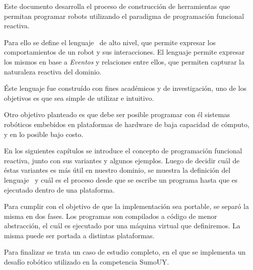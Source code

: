 
  Este documento desarrolla el proceso de construcción de
herramientas
que permitan programar robots utilizando el paradigma de
programación funcional reactiva.

  Para ello se define el lenguaje \frob\ de alto nivel,
que permite expresar los comportamientos de un robot y sus
interacciones.
  El lenguaje permite expresar los mismos en base a
\emph{Eventos} y relaciones entre ellos, que permiten
capturar la naturaleza reactiva del dominio.

  Éste lenguaje fue construído con fines académicos y de
investigación, uno de los objetivos es que sea simple de
utilizar e intuitivo.

  Otro objetivo planteado es que debe ser posible programar
con él sistemas robóticos embebidos en plataformas de
hardware de baja capacidad de cómputo, y en lo posible
bajo costo.

  En los siguientes capítulos se introduce el concepto de
programación funcional reactiva, junto con sus variantes y
algunos ejemplos.
  Luego de decidir cuál de éstas variantes es más útil
en nuestro dominio, se muestra la definición del lenguaje
\frob\ y cuál es el proceso desde que se escribe un programa
hasta que es ejecutado dentro de una plataforma.

  Para cumplir con el objetivo de que la implementación sea
portable, se separó la misma en dos fases. Los programas son
compilados a código de menor abstracción, el cuál es
ejecutado por una máquina virtual que definiremos.
  La misma puede ser portada a distintas plataformas.

  Para finalizar se trata un caso de estudio completo, en el
que se implementa un desafío robótico utilizado en la competencia
SumoUY.
